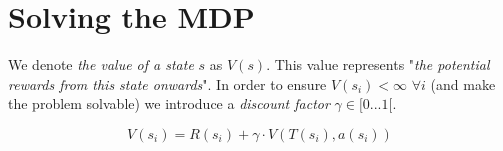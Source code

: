 \documentclass[11pt]{article}
\begin{document}
\newpage

\section{Solving the MDP}

We denote \textit{the value of a state} $s$ as $V(s)$. This value represents "\textit{the potential rewards from this state onwards}". In order to ensure $V(s_i) < \infty$ $\forall i$ (and make the problem solvable) we introduce a \textit{discount factor} $\gamma \in [0 ... 1 [$.

\[V(s_i) = R(s_i) + \gamma \cdot V(T(s_i),a(s_i))\]
\end{document}
